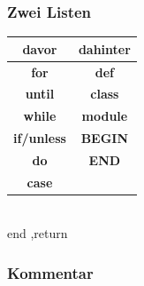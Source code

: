\begin{frame}
	\frametitle{Zwei Listen}
	\begin{center}
		\begin{tabular}{c|c}
			\textbf{davor} & \textbf{dahinter} \\ 
			\hline 
			\textbf{for} & \textbf{def} \\ 
			\textbf{until} & \textbf{class} \\
			\textbf{while} & \textbf{module} \\
			\textbf{if/unless} & \textbf{BEGIN} \\
			\textbf{do} & \textbf{END} \\
			\textbf{case} &  \\
		\end{tabular}
		\\end ,return
	\end{center}
	
\end{frame}

\begin{frame}
	\frametitle{Kommentar}
	\inputminted[linenos, frame=lines, label=Beispiel 2]{ruby}{scopes/beispiel2.rb}
\end{frame}

